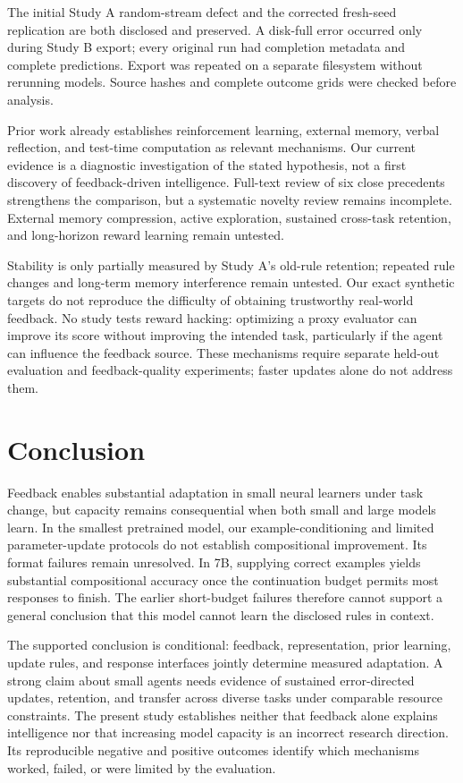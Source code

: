 \documentclass[11pt]{article}
\begin{document}
The initial Study A random-stream defect and the corrected fresh-seed
replication are both disclosed and preserved. A disk-full error occurred only
during Study B export; every original run had completion metadata and complete
predictions. Export was repeated on a separate filesystem without rerunning
models. Source hashes and complete outcome grids were checked before analysis.

Prior work already establishes reinforcement learning, external memory,
verbal reflection, and test-time computation as relevant mechanisms. Our
current evidence is a diagnostic investigation of the stated hypothesis, not
a first discovery of feedback-driven intelligence. Full-text review of six
close precedents strengthens the comparison, but a systematic novelty review
remains incomplete. External memory compression, active exploration, sustained
cross-task retention, and long-horizon reward learning remain untested.

Stability is only partially measured by Study A's old-rule retention; repeated
rule changes and long-term memory interference remain untested. Our exact
synthetic targets do not reproduce the difficulty of obtaining trustworthy
real-world feedback. No study tests reward hacking: optimizing a proxy evaluator
can improve its score without improving the intended task, particularly if the
agent can influence the feedback source. These mechanisms require separate
held-out evaluation and feedback-quality experiments; faster updates alone do
not address them.

\section{Conclusion}
Feedback enables substantial adaptation in small neural learners under task
change, but capacity remains consequential when both small and large models
learn. In the smallest pretrained model, our example-conditioning and limited
parameter-update protocols do not establish compositional improvement. Its
format failures remain unresolved. In 7B, supplying correct examples yields
substantial compositional accuracy once the continuation budget permits most
responses to finish. The earlier short-budget failures therefore cannot support
a general conclusion that this model cannot learn the disclosed rules in context.

The supported conclusion is conditional: feedback, representation, prior
learning, update rules, and response interfaces jointly determine measured
adaptation. A strong claim about small agents needs evidence of sustained
error-directed updates, retention, and transfer across diverse tasks under
comparable resource constraints. The present study establishes neither that
feedback alone explains intelligence nor that increasing model capacity is an
incorrect research direction. Its reproducible negative and positive outcomes
identify which mechanisms worked, failed, or were limited by the evaluation.
\end{document}

